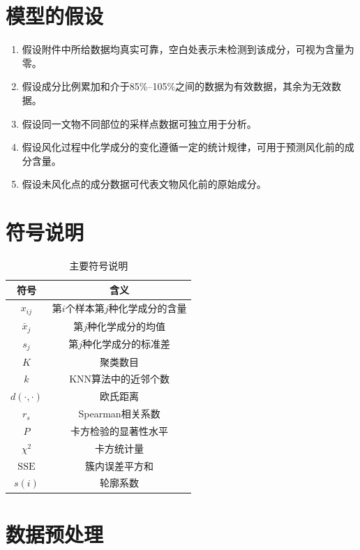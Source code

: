 \documentclass{cumcmthesis}
\begin{document}
\section{模型的假设}

\begin{enumerate}
    \item 假设附件中所给数据均真实可靠，空白处表示未检测到该成分，可视为含量为零。
    \item 假设成分比例累加和介于85\%--105\%之间的数据为有效数据，其余为无效数据。
    \item 假设同一文物不同部位的采样点数据可独立用于分析。
    \item 假设风化过程中化学成分的变化遵循一定的统计规律，可用于预测风化前的成分含量。
    \item 假设未风化点的成分数据可代表文物风化前的原始成分。
\end{enumerate}

\section{符号说明}

\begin{table}[!htbp]
    \centering
    \caption{主要符号说明}
    \label{tab:symbols}
    \begin{tabular}{c|c}
        \toprule[1.5pt]
        符号 & 含义 \\
        \midrule[1pt]
        $x_{ij}$ & 第$i$个样本第$j$种化学成分的含量 \\
        $\bar{x}_j$ & 第$j$种化学成分的均值 \\
        $s_j$ & 第$j$种化学成分的标准差 \\
        $K$ & 聚类数目 \\
        $k$ & KNN算法中的近邻个数 \\
        $d(\cdot,\cdot)$ & 欧氏距离 \\
        $r_s$ & Spearman相关系数 \\
        $P$ & 卡方检验的显著性水平 \\
        $\chi^2$ & 卡方统计量 \\
        $\text{SSE}$ & 簇内误差平方和 \\
        $s(i)$ & 轮廓系数 \\
        \bottomrule[1.5pt]
    \end{tabular}
\end{table}

\section{数据预处理}
\end{document}
